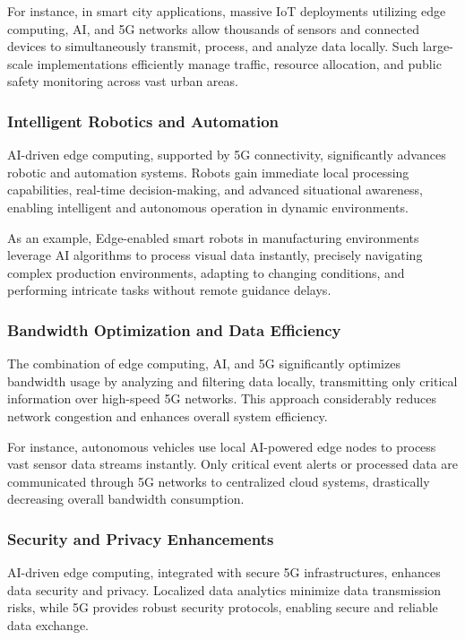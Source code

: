 \documentclass[runningheads]{llncs}
\begin{document}
\noindent For instance, in smart city applications, massive IoT deployments utilizing edge computing, AI, and 5G networks allow thousands of sensors and connected devices to simultaneously transmit, process, and analyze data locally. Such large-scale implementations efficiently manage traffic, resource allocation, and public safety monitoring across vast urban areas.

\subsubsection{Intelligent Robotics and Automation}
AI-driven edge computing, supported by 5G connectivity, significantly advances robotic and automation systems. Robots gain immediate local processing capabilities, real-time decision-making, and advanced situational awareness, enabling intelligent and autonomous operation in dynamic environments.

\noindent As an example, Edge-enabled smart robots in manufacturing environments leverage AI algorithms to process visual data instantly, precisely navigating complex production environments, adapting to changing conditions, and performing intricate tasks without remote guidance delays.

\subsubsection{Bandwidth Optimization and Data Efficiency}
The combination of edge computing, AI, and 5G significantly optimizes bandwidth usage by analyzing and filtering data locally, transmitting only critical information over high-speed 5G networks. This approach considerably reduces network congestion and enhances overall system efficiency.

\noindent For instance, autonomous vehicles use local AI-powered edge nodes to process vast sensor data streams instantly. Only critical event alerts or processed data are communicated through 5G networks to centralized cloud systems, drastically decreasing overall bandwidth consumption.

\subsubsection{Security and Privacy Enhancements}
AI-driven edge computing, integrated with secure 5G infrastructures, enhances data security and privacy. Localized data analytics minimize data transmission risks, while 5G provides robust security protocols, enabling secure and reliable data exchange.
\end{document}
